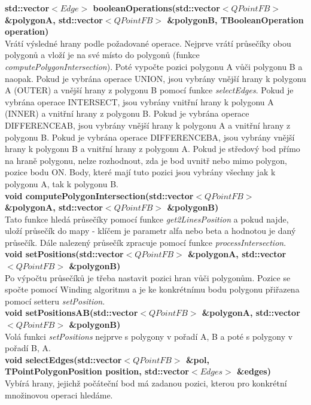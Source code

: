 \documentclass[a4paper,11pt,twoside]{article}
\begin{document}
\newpage
\vspace*{-1cm}
\noindent\textbf{std::vector$<Edge>$ booleanOperations(std::vector$<QPointFB>$ \&polygonA,  std::vector$<QPointFB>$ \&polygonB, TBooleanOperation operation)}\\
Vrátí výsledné hrany podle požadované operace. Nejprve vrátí průsečíky obou polygonů a vloží je na své místo do polygonů (funkce \textit{computePolygonIntersection}). Poté vypočte pozici polygonu A vůči polygonu B a naopak. Pokud je vybrána operace UNION, jsou vybrány vnější hrany k polygonu A (OUTER) a vnější hrany z polygonu B pomocí funkce \textit{selectEdges}. Pokud je vybrána operace INTERSECT, jsou vybrány vnitřní hrany k polygonu A (INNER) a vnitřní hrany z polygonu B. Pokud je vybrána operace DIFFERENCEAB, jsou vybrány vnější hrany k polygonu A a vnitřní hrany z polygonu B. Pokud je vybrána operace DIFFERENCEBA, jsou vybrány vnější hrany k polygonu B a vnitřní hrany z polygonu A.  Pokud je středový bod přímo na hraně polygonu, nelze rozhodnout, zda je bod uvnitř nebo mimo polygon, pozice bodu ON. Body, které mají tuto pozici jsou vybrány všechny jak k polygonu A, tak k polygonu B.\\

\noindent\textbf{void computePolygonIntersection(std::vector$<QPointFB>$ \&polygonA, std::vector$<QPointFB>$ \&polygonB)}\\
Tato funkce hledá průsečíky pomocí funkce \textit{get2LinesPosition} a pokud najde, uloží průsečík do mapy - klíčem je parametr alfa nebo beta a hodnotou je daný průsečík. Dále nalezený průsečík zpracuje pomocí funkce \textit{processIntersection}.\\

\noindent\textbf{void setPositions(std::vector$<QPointFB>$ \&polygonA, std::vector$<QPointFB>$ \&polygonB)}\\
Po výpočtu průsečíků je třeba nastavit pozici hran vůči polygonům. Pozice se spočte pomocí Winding algoritmu a je ke konkrétnímu bodu polygonu přiřazena pomocí setteru \textit{setPosition}.\\

\noindent\textbf{void setPositionsAB(std::vector$<QPointFB>$ \&polygonA, std::vector$<QPointFB>$ \&polygonB)}\\
Volá funkci \textit{setPositions} nejprve s polygony v pořadí A, B a poté s polygony v pořadí B, A.\\

\newpage
\vspace*{-1cm}
\noindent\textbf{void selectEdges(std::vector$<QPointFB>$ \&pol, TPointPolygonPosition position, std::vector$<Edges>$ \&edges)}\\
Vybírá hrany, jejichž počáteční bod má zadanou pozici, kterou pro konkrétní množinovou operaci hledáme.
\end{document}
